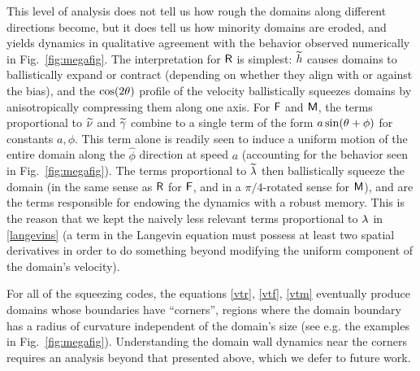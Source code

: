 \documentclass[pra,aps,twocolumn,groupedaddress,superscriptaddress,nofootinbib,preprintnumbers]{revtex4-2}
\begin{document}
	This level of analysis does not tell us how rough the domains along different directions become, but it does tell us how minority domains are eroded, and yields dynamics in qualitative agreement with the behavior observed numerically in Fig.~\ref{fig:megafig}. The interpretation for $\mathsf{R}$ is simplest: $\widetilde h$ causes domains to ballistically expand or contract (depending on whether they align with or against the bias), and the $\cos(2\theta)$ profile of the velocity ballistically squeezes domains by anisotropically compressing them along one axis. For $\mathsf{F}$ and $\mathsf{M}$, the terms proportional to $\widetilde \nu$ and $\widetilde {\gamma}$ combine to a single term of the form $a \sin(\theta + \phi)$ for constants $a,\phi$. This term alone is readily seen to induce a uniform motion of the entire domain along the $\widehat\phi$ direction at speed $a$ (accounting for the behavior seen in Fig.~\ref{fig:megafig}). The terms proportional to $\widetilde {\lambda}$ then ballistically squeeze the domain (in the same sense as $\mathsf{R}$ for $\mathsf{F}$, and in a $\pi/4$-rotated sense for $\mathsf{M}$), and are the terms responsible for endowing the dynamics with a robust memory. This is the reason that we kept the naively less relevant terms proportional to $\lambda$ in \eqref{langevins} (a term in the Langevin equation must possess at least two spatial derivatives in order to do something beyond modifying the uniform component of the domain's velocity). 
	
	 For all of the squeezing codes, the equations \eqref{vtr}, \eqref{vtf}, \eqref{vtm} eventually produce domains whose boundaries have ``corners'', regions where the domain boundary has a radius of curvature independent of the domain's size (see e.g. the examples in Fig.~\ref{fig:megafig}). Understanding the domain wall dynamics near the corners requires an analysis beyond that presented above, which we defer to future work. 
	
	 	
	
	
\end{document}
